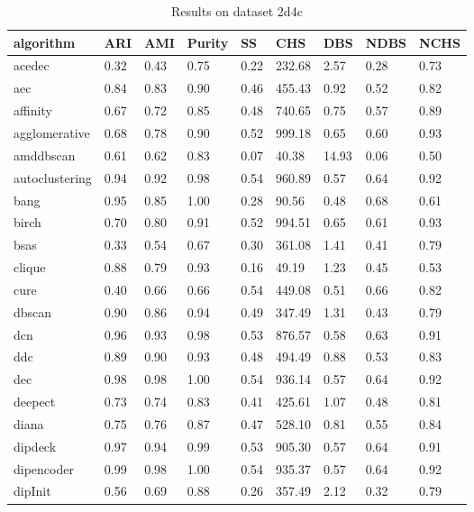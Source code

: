 \begin{table}[H]
\centering
\caption{Results on dataset 2d4c}
\label{S52_Table}
\begin{tabular}{|l|l|l|l|l|l|l|l|l|}
\hline
algorithm & ARI & AMI & Purity & SS & CHS & DBS & NDBS & NCHS \\
\hline
acedec & 0.32 & 0.43 & 0.75 & 0.22 & 232.68 & 2.57 & 0.28 & 0.73 \\
\hline
aec & 0.84 & 0.83 & 0.90 & 0.46 & 455.43 & 0.92 & 0.52 & 0.82 \\
\hline
affinity & 0.67 & 0.72 & 0.85 & 0.48 & 740.65 & 0.75 & 0.57 & 0.89 \\
\hline
agglomerative & 0.68 & 0.78 & 0.90 & 0.52 & 999.18 & 0.65 & 0.60 & 0.93 \\
\hline
amddbscan & 0.61 & 0.62 & 0.83 & 0.07 & 40.38 & 14.93 & 0.06 & 0.50 \\
\hline
autoclustering & 0.94 & 0.92 & 0.98 & 0.54 & 960.89 & 0.57 & 0.64 & 0.92 \\
\hline
bang & 0.95 & 0.85 & 1.00 & 0.28 & 90.56 & 0.48 & 0.68 & 0.61 \\
\hline
birch & 0.70 & 0.80 & 0.91 & 0.52 & 994.51 & 0.65 & 0.61 & 0.93 \\
\hline
bsas & 0.33 & 0.54 & 0.67 & 0.30 & 361.08 & 1.41 & 0.41 & 0.79 \\
\hline
clique & 0.88 & 0.79 & 0.93 & 0.16 & 49.19 & 1.23 & 0.45 & 0.53 \\
\hline
cure & 0.40 & 0.66 & 0.66 & 0.54 & 449.08 & 0.51 & 0.66 & 0.82 \\
\hline
dbscan & 0.90 & 0.86 & 0.94 & 0.49 & 347.49 & 1.31 & 0.43 & 0.79 \\
\hline
dcn & 0.96 & 0.93 & 0.98 & 0.53 & 876.57 & 0.58 & 0.63 & 0.91 \\
\hline
ddc & 0.89 & 0.90 & 0.93 & 0.48 & 494.49 & 0.88 & 0.53 & 0.83 \\
\hline
dec & 0.98 & 0.98 & 1.00 & 0.54 & 936.14 & 0.57 & 0.64 & 0.92 \\
\hline
deepect & 0.73 & 0.74 & 0.83 & 0.41 & 425.61 & 1.07 & 0.48 & 0.81 \\
\hline
diana & 0.75 & 0.76 & 0.87 & 0.47 & 528.10 & 0.81 & 0.55 & 0.84 \\
\hline
dipdeck & 0.97 & 0.94 & 0.99 & 0.53 & 905.30 & 0.57 & 0.64 & 0.91 \\
\hline
dipencoder & 0.99 & 0.98 & 1.00 & 0.54 & 935.37 & 0.57 & 0.64 & 0.92 \\
\hline
dipInit & 0.56 & 0.69 & 0.88 & 0.26 & 357.49 & 2.12 & 0.32 & 0.79 \\

\end{tabular}
\end{table}
